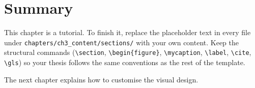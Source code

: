 \section{Summary}\label{ch3sec:summary}

This chapter is a tutorial. To finish it, replace the placeholder text in every file under \texttt{chapters/ch3\_content/sections/} with your own content. Keep the structural commands (\verb|\section|, \verb|\begin{figure}|, \verb|\mycaption|, \verb|\label|, \verb|\cite|, \verb|\gls|) so your thesis follows the same conventions as the rest of the template.

The next chapter explains how to customise the visual design.
